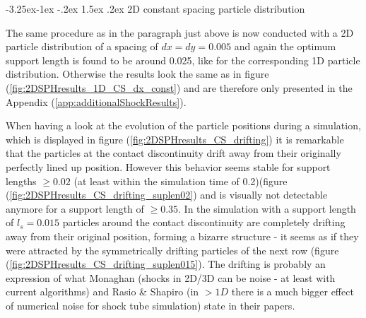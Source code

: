 \documentclass[11pt,a4paper,twoside]{report}
\makeatletter
\renewcommand\paragraph{\@startsection{paragraph}{4}{\z@}%
  {-3.25ex\@plus -1ex \@minus -.2ex}%
  {1.5ex \@plus .2ex}%
  {\normalfont\normalsize\bfseries}}
\makeatother
\begin{document}
\paragraph{2D constant spacing particle distribution}

The same procedure as in the paragraph just above is now conducted with a 2D particle distribution of a spacing of $dx=dy=0.005$ and again the optimum support length is found to be around 0.025, like for the corresponding 1D particle distribution. Otherwise the results look the same as in figure (\ref{fig:2DSPHresults_1D_CS_dx_const}) and are therefore only presented in the Appendix (\ref{app:additionalShockResults}).

When having a look at the evolution of the particle positions during a simulation, which is displayed in figure (\ref{fig:2DSPHresults_CS_drifting}) it is remarkable that the particles at the contact discontinuity drift away from their originally perfectly lined up position. However this behavior seems stable for support lengths $\geq0.02$ (at least within the simulation time of 0.2)(figure (\ref{fig:2DSPHresults_CS_drifting_suplen02}) and is visually not detectable anymore for a support length of $\geq0.35$. In the simulation with a support length of $l_s=0.015$ particles around the contact discontinuity are completely drifting  away from their original position, forming a bizarre structure - it seems as if they were attracted by the symmetrically drifting particles of the next row (figure (\ref{fig:2DSPHresults_CS_drifting_suplen015}). 
The drifting is probably an expression of what Monaghan \cite{Monaghan2005} (shocks in 2D/3D can be noise - at least with current algorithms) and Rasio \& Shapiro \cite{Rasio1991} (in $>1D$ there is a much bigger effect of numerical noise for shock tube simulation) state in their papers.
\end{document}
